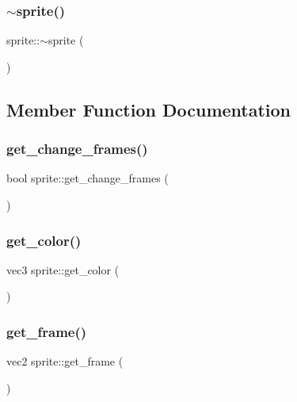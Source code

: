 \subsubsection{\texorpdfstring{$\sim$sprite()}{~sprite()}}
{\footnotesize\ttfamily sprite\+::$\sim$sprite (\begin{DoxyParamCaption}{ }\end{DoxyParamCaption})\hspace{0.3cm}{\ttfamily [inline]}}



\subsection{Member Function Documentation}
\mbox{\label{classsprite_a935dcb319f155f0fcb698e2c082e3f2c}} 
\subsubsection{\texorpdfstring{get\+\_\+change\+\_\+frames()}{get\_change\_frames()}}
{\footnotesize\ttfamily bool sprite\+::get\+\_\+change\+\_\+frames (\begin{DoxyParamCaption}{ }\end{DoxyParamCaption})\hspace{0.3cm}{\ttfamily [inline]}}

\mbox{\label{classsprite_a47cf0b71c2e1f8b8df582ed341991043}} 
\subsubsection{\texorpdfstring{get\+\_\+color()}{get\_color()}}
{\footnotesize\ttfamily vec3 sprite\+::get\+\_\+color (\begin{DoxyParamCaption}{ }\end{DoxyParamCaption})\hspace{0.3cm}{\ttfamily [inline]}}

\mbox{\label{classsprite_a76bc14c424cd83e145cbe056cb4a5572}} 
\subsubsection{\texorpdfstring{get\+\_\+frame()}{get\_frame()}}
{\footnotesize\ttfamily vec2 sprite\+::get\+\_\+frame (\begin{DoxyParamCaption}{ }\end{DoxyParamCaption})\hspace{0.3cm}{\ttfamily [inline]}}

